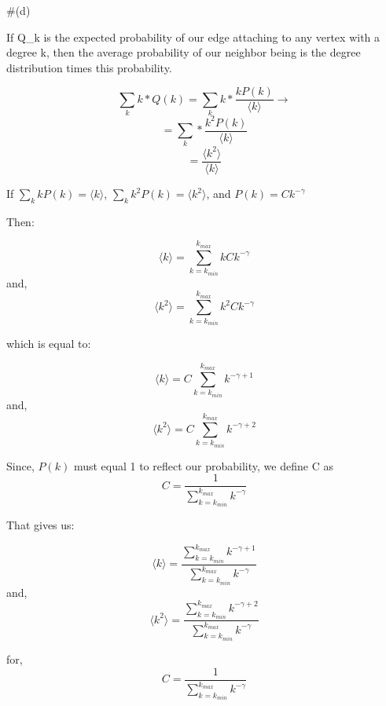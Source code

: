 \documentclass[11pt]{article}
\begin{document}
    \#(d)

If Q\_k is the expected probability of our edge attaching to any vertex
with a degree k, then the average probability of our neighbor being is
the degree distribution times this probability.

\[\sum_{k}{k}*Q(k) = \sum_{k}{k} * \frac{kP(k)}{\langle k \rangle} \rightarrow\]
\[= \sum_{k}{} * \frac{k^2P(k)}{\langle k \rangle}\]
\[= \frac{\langle k^2 \rangle}{\langle k \rangle}\]

    If \(\sum_k{k}P(k)=\langle k \rangle\),
\(\sum_k{k^2}P(k)=\langle k^2 \rangle\), and \(P(k)=Ck^{-\gamma}\)

Then:

\[\langle k \rangle = \sum_{k=k_{min}}^{k_{max}}{k}Ck^{-\gamma}\] and,
\[\langle k^2 \rangle = \sum_{k=k_{min}}^{k_{max}}{k^2}Ck^{-\gamma}\]

which is equal to:

\[\langle k \rangle = C \sum_{k=k_{min}}^{k_{max}}{k^{-\gamma + 1}}\]
and,
\[\langle k^2 \rangle = C \sum_{k=k_{min}}^{k_{max}}{k^{-\gamma + 2}}\]

Since, \(P(k)\) must equal 1 to reflect our probability, we define C as
\[C= \frac{1}{\sum_{k=k_{min}}^{k_{max}}k^{-\gamma}}\]

That gives us:

\[\langle k \rangle = \frac{\sum_{k=k_{min}}^{k_{max}}{k^{-\gamma + 1}}}{\sum_{k=k_{min}}^{k_{max}}k^{-\gamma}} \]
and,
\[\langle k^2 \rangle =  \frac{\sum_{k=k_{min}}^{k_{max}}{k^{-\gamma + 2}}}{\sum_{k=k_{min}}^{k_{max}}k^{-\gamma}} \]

for, \[C= \frac{1}{\sum_{k=k_{min}}^{k_{max}}k^{-\gamma}}\]
\end{document}
